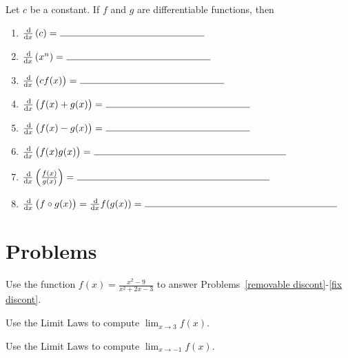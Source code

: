 \documentclass[12pt]{amsart}
\begin{document}
\begin{thm}
  Let \(c\) be a constant.
  If \(f\) and \(g\) are differentiable functions, then
  \begin{enumerate}
  \item
    \(\frac{\dif}{\dif x}\left(c\right) =\ \line(1,0){150}\)
    \vspace{.25in}
  \item
    \(\frac{\dif}{\dif x}\left(x^n\right) =\ \line(1,0){150}\)
    \vspace{.25in}
  \item
    \(\frac{\dif}{\dif x}\left(cf(x)\right) =\ \line(1,0){150}\)
    \vspace{.25in}
  \item
    \(\frac{\dif}{\dif x}\left(f(x) + g(x)\right) =\ \line(1,0){150}\)
    \vspace{.25in}
  \item
    \(\frac{\dif}{\dif x}\left(f(x) - g(x)\right) =\ \line(1,0){150}\)
    \vspace{.25in}
  \item
    \(\frac{\dif}{\dif x}\left(f(x)g(x)\right) =\ \line(1,0){200}\)
    \vspace{.25in}
  \item
    \(\frac{\dif}{\dif x}\left(\frac{f(x)}{g(x)}\right) =\ \line(1,0){200}\)
    \vspace{.25in}
  \item
    \(\frac{\dif}{\dif x}\left(f \circ g (x)\right) = \frac{\dif}{\dif x} f(g(x)) =\ \line(1,0){200}\)
  \end{enumerate}
\end{thm}

\section*{Problems}
\noindent
Use the function \(\displaystyle{f(x) = \frac{x^2 - 9}{x^2 + 2x - 3}}\) to answer Problems~\ref{removable discont}-\ref{fix discont}.

\begin{thm}[5 Points]\label{removable discont}
  Use the Limit Laws to compute \(\lim_{x \to 3} f(x)\).
\end{thm}

\vspace{2in}

\begin{thm}[5 Points]\label{infinite limit}
  Use the Limit Laws to compute \(\lim_{x \to -1} f(x)\).
\end{thm}
\end{document}
